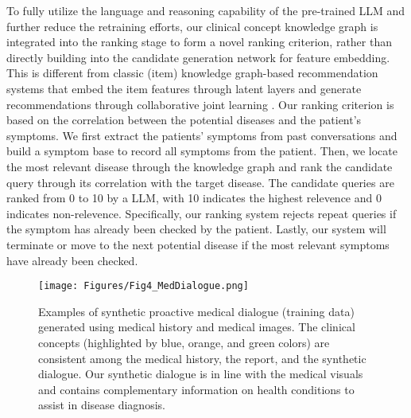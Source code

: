 To fully utilize the language and reasoning capability of the pre-trained LLM and further reduce the retraining efforts, our clinical concept knowledge graph is integrated into the ranking stage to form a novel ranking criterion, rather than directly building into the candidate generation network for feature embedding. This is different from classic (item) knowledge graph-based recommendation systems that embed the item features through latent layers and generate recommendations through collaborative joint learning \cite{zhang2016collaborative, zhang2018learning, cao2019unifying, guo2020survey}. Our ranking criterion is based on the correlation between the potential diseases and the patient's symptoms. We first extract the patients' symptoms from past conversations and build a symptom base to record all symptoms from the patient. Then, we locate the most relevant disease through the knowledge graph and rank the candidate query through its correlation with the target disease. The candidate queries are ranked from 0 to 10 by a LLM, with 10 indicates the highest relevence and 0 indicates non-relevence. Specifically, our ranking system rejects repeat queries if the symptom has already been checked by the patient. Lastly, our system will terminate or move to the next potential disease if the most relevant symptoms have already been checked.

\begin{figure*}[t]
\centering
\texttt{[image: Figures/Fig4\_MedDialogue.png]}
\caption{Examples of synthetic proactive medical dialogue (training data) generated using medical history and medical images. The clinical concepts (highlighted by blue, orange, and green colors) are consistent among the medical history, the report, and the synthetic dialogue. Our synthetic dialogue is in line with the medical visuals and contains complementary information on health conditions to assist in disease diagnosis. }
\label{fig4_medialogue}
\end{figure*}

